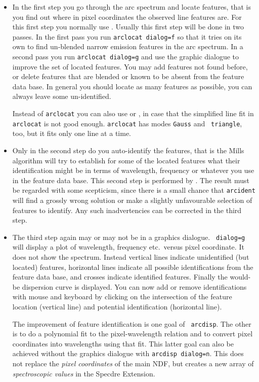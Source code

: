 \begin{itemize}
\item In the first step you go through the arc spectrum and locate
   features, that is you find out where in pixel coordinates the
   observed line features are.  For this first step you normally use
{\tt{}}.
   Usually this first step will be done in two passes. In the first pass
   you run {\tt arclocat dialog=f} so that it tries on its own to find
   un-blended narrow emission features in the arc spectrum.  In a second
   pass you run {\tt arclocat dialog=g} and use the graphic dialogue to
   improve the set of located features.  You may add features not found
   before, or delete features that are blended or known to be absent
   from the feature data base.  In general you should locate as many
   features as possible, you can always leave some un-identified.

   Instead of {\tt arclocat} you can also use
{\tt{}}
   or
{\tt{}},
   in case that the simplified line fit in {\tt arclocat} is
   not good enough.  {\tt arclocat} has modes {\tt Gauss} and {\tt
   triangle}, too, but it fits only one line at a time.

\item Only in the second step do you auto-identify the features, that is
   the Mills algorithm will try to establish for some of the located
   features what their identification might be in terms of wavelength,
   frequency or whatever you use in the feature data base.  This second
   step is performed by
{\tt{}}.
   The result must be regarded with some scepticism, since there is a
   small chance that {\tt arcident} will find a grossly wrong solution or
   make a slightly unfavourable selection of features to identify.  Any
   such inadvertencies can be corrected in the third step.

\item The third step again may or may not be in a graphics dialogue.
{\tt{} dialog=g} will display a plot of
   wavelength, frequency etc.\ versus pixel coordinate.  It does not
   show the spectrum. Instead vertical lines indicate unidentified (but
   located) features, horizontal lines indicate all possible
   identifications from the feature data base, and crosses indicate
   identified features. Finally the would-be dispersion curve is
   displayed.  You can now add or remove identifications with mouse and
   keyboard by clicking on the intersection of the feature location
   (vertical line) and potential identification (horizontal line).

   The improvement of feature identification is one goal of {\tt
   arcdisp}.  The other is to do a polynomial fit to the
   pixel-wavelength relation and to convert pixel coordinates into
   wavelengths using that fit.  This latter goal can also be achieved
   without the graphics dialogue with {\tt arcdisp dialog=n}.  This does
   not replace the {\it pixel coordinates} of the main NDF, but creates
   a new array of {\it spectroscopic values} in the Specdre Extension.
\end{itemize}

